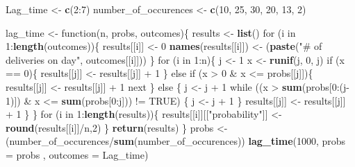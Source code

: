 \documentclass[]{article}
\newenvironment{Shaded}{\begin{snugshade}}{\end{snugshade}}
\newcommand{\KeywordTok}[1]{\textcolor[rgb]{0.13,0.29,0.53}{\textbf{{#1}}}}
\newcommand{\DataTypeTok}[1]{\textcolor[rgb]{0.13,0.29,0.53}{{#1}}}
\newcommand{\DecValTok}[1]{\textcolor[rgb]{0.00,0.00,0.81}{{#1}}}
\newcommand{\StringTok}[1]{\textcolor[rgb]{0.31,0.60,0.02}{{#1}}}
\newcommand{\OtherTok}[1]{\textcolor[rgb]{0.56,0.35,0.01}{{#1}}}
\newcommand{\NormalTok}[1]{{#1}}
\begin{document}
\begin{Shaded}
\begin{Highlighting}[]
\NormalTok{Lag_time <-}\StringTok{ }\KeywordTok{c}\NormalTok{(}\DecValTok{2}\NormalTok{:}\DecValTok{7}\NormalTok{)}
\NormalTok{number_of_occurences <-}\StringTok{ }\KeywordTok{c}\NormalTok{(}\DecValTok{10}\NormalTok{, }\DecValTok{25}\NormalTok{, }\DecValTok{30}\NormalTok{, }\DecValTok{20}\NormalTok{, }\DecValTok{13}\NormalTok{, }\DecValTok{2}\NormalTok{)}

\NormalTok{lag_time <-}\StringTok{ }\NormalTok{function(n, probs, outcomes)\{}
        \NormalTok{results <-}\StringTok{ }\KeywordTok{list}\NormalTok{()}
        \NormalTok{for (i in }\DecValTok{1}\NormalTok{:}\KeywordTok{length}\NormalTok{(outcomes))\{}
         \NormalTok{results[[i]] <-}\StringTok{ }\DecValTok{0}
         \KeywordTok{names}\NormalTok{(results[[i]]) <-}\StringTok{ }\NormalTok{(}\KeywordTok{paste}\NormalTok{(}\StringTok{"# of deliveries on day"}\NormalTok{, outcomes[[i]]))}
        \NormalTok{\}}
     \NormalTok{for (i in }\DecValTok{1}\NormalTok{:n)\{}
       \NormalTok{j <-}\StringTok{ }\DecValTok{1} 
       \NormalTok{x <-}\StringTok{ }\KeywordTok{runif}\NormalTok{(j, }\DecValTok{0}\NormalTok{, j)}
       \NormalTok{if (x ==}\StringTok{ }\DecValTok{0}\NormalTok{)\{}
        \NormalTok{results[[j]] <-}\StringTok{ }\NormalTok{results[[j]] +}\StringTok{ }\DecValTok{1}
       \NormalTok{\} else if (x >}\StringTok{ }\DecValTok{0} \NormalTok{&}\StringTok{ }\NormalTok{x <=}\StringTok{ }\NormalTok{probs[[j]])\{}
        \NormalTok{results[[j]] <-}\StringTok{ }\NormalTok{results[[j]] +}\StringTok{ }\DecValTok{1}
        \NormalTok{next}
       \NormalTok{\} else \{}
       \NormalTok{j <-}\StringTok{ }\NormalTok{j +}\StringTok{ }\DecValTok{1}
       \NormalTok{while ((x >}\StringTok{ }\KeywordTok{sum}\NormalTok{(probs[}\DecValTok{0}\NormalTok{:(j}\DecValTok{-1}\NormalTok{)]) &}\StringTok{ }\NormalTok{x <=}\StringTok{ }\KeywordTok{sum}\NormalTok{(probs[}\DecValTok{0}\NormalTok{:j])) !=}\StringTok{ }\OtherTok{TRUE}\NormalTok{) \{}
       \NormalTok{j <-}\StringTok{ }\NormalTok{j +}\StringTok{ }\DecValTok{1}
       \NormalTok{\}}
       \NormalTok{results[[j]] <-}\StringTok{ }\NormalTok{results[[j]] +}\StringTok{ }\DecValTok{1}
       \NormalTok{\}}
     \NormalTok{\}}
    \NormalTok{for (i in }\DecValTok{1}\NormalTok{:}\KeywordTok{length}\NormalTok{(results))\{}
     \NormalTok{results[[i]][[}\StringTok{"probability"}\NormalTok{]] <-}\StringTok{ }\KeywordTok{round}\NormalTok{(results[[i]]/n,}\DecValTok{2}\NormalTok{)}
    \NormalTok{\}}
  \KeywordTok{return}\NormalTok{(results)}
\NormalTok{\}}
\NormalTok{probs <-}\StringTok{ }\NormalTok{(number_of_occurences/}\KeywordTok{sum}\NormalTok{(number_of_occurences))}
\KeywordTok{lag_time}\NormalTok{(}\DecValTok{1000}\NormalTok{, }\DataTypeTok{probs =} \NormalTok{probs , }\DataTypeTok{outcomes =} \NormalTok{Lag_time)}
\end{Highlighting}
\end{Shaded}
\end{document}
